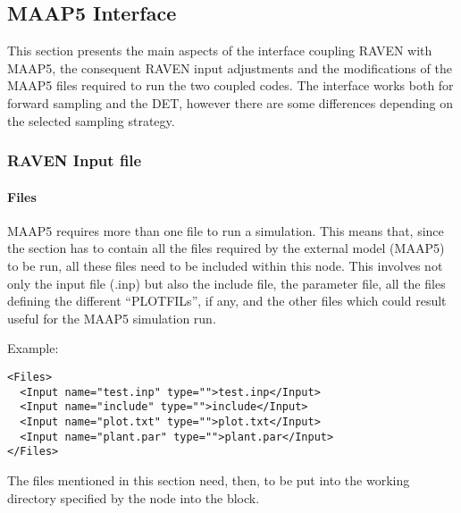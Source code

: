 \subsection{MAAP5 Interface}
This section presents the main aspects of the interface coupling RAVEN with MAAP5,
the consequent RAVEN input adjustments and the modifications of the MAAP5
files required to run the two coupled codes.
The interface works both for forward sampling and the DET,
however there are some differences depending on the selected sampling strategy.
\subsubsection{RAVEN Input file}
\paragraph{Files}
MAAP5 requires more than one file to run a simulation.
This means that, since the  section has to contain all the files required by
the external model (MAAP5) to be run, all these files need to be included within this node.
This involves not only the input file (.inp) but also the include file, the parameter file, all the
files defining the different ``PLOTFILs'', if any, and the other files which could
result useful for the MAAP5 simulation run.

Example:
\begin{lstlisting}[style=XML]
<Files>
  <Input name="test.inp" type="">test.inp</Input>
  <Input name="include" type="">include</Input>
  <Input name="plot.txt" type="">plot.txt</Input>
  <Input name="plant.par" type="">plant.par</Input>
</Files>
\end{lstlisting}
The files mentioned in this section
 need, then, to be put into the working directory specified
by the  node into the  block.
